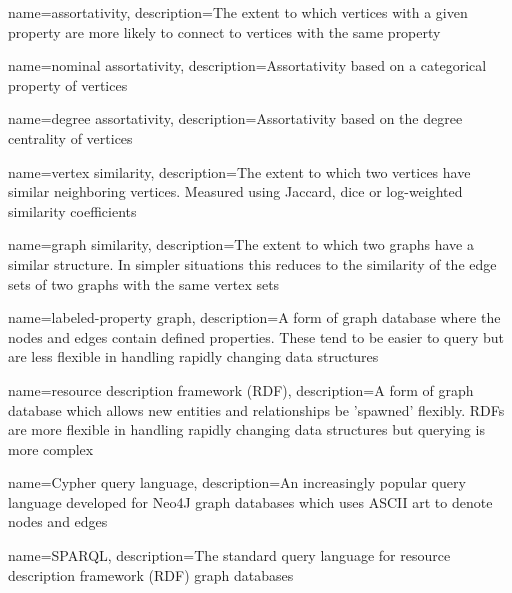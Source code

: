 {
    name={assortativity},
    description={The extent to which vertices with a given property are more likely to connect to vertices with the same property}
}

{
    name={nominal assortativity},
    description={Assortativity based on a categorical property of vertices}
}

{
    name={degree assortativity},
    description={Assortativity based on the degree centrality of vertices}
}

{
    name={vertex similarity},
    description={The extent to which two vertices have similar neighboring vertices.  Measured using Jaccard, dice or log-weighted similarity coefficients}
}

{
    name={graph similarity},
    description={The extent to which two graphs have a similar structure.  In simpler situations this reduces to the similarity of the edge sets of two graphs with the same vertex sets}
}

{
    name={labeled-property graph},
    description={A form of graph database where the nodes and edges contain defined properties.  These tend to be easier to query but are less flexible in handling rapidly changing data structures}
}

{
    name={resource description framework (RDF)},
    description={A form of graph database which allows new entities and relationships be 'spawned' flexibly.  RDFs are more flexible in handling rapidly changing data structures but querying is more complex}
}

{
    name={Cypher query language},
    description={An increasingly popular query language developed for Neo4J graph databases which uses ASCII art to denote nodes and edges}
}

{
    name={SPARQL},
    description={The standard query language for resource description framework (RDF) graph databases}
}



\glsaddall

\usepackage{tcolorbox}


  
\usepackage{footnote}
\usepackage{etoolbox}

\frontmatter
